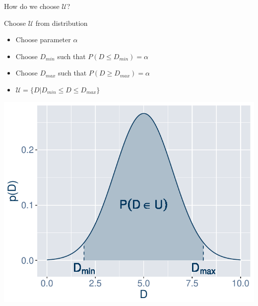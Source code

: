\documentclass[slides]{beamer}
\begin{document}
\begin{frame}{How do we choose $\mathcal{U}$?}
\vspace{-10pt}
\begin{block}{Choose $\mathcal{U}$ from distribution}
    \begin{minipage}[t]{.47\textwidth}


        \begin{itemize}
            \item Choose parameter $\alpha$
            \item Choose $D_{min}$ such that $P(D \leq D_{min}) = \alpha$
            \item Choose $D_{max}$ such that $P(D \geq D_{max}) = \alpha$
            \item $\mathcal{U} = \{D|D_{min} \leq D \leq D_{max}\}$
        \end{itemize}

    \end{minipage}
    \hfill\hfill
    \begin{minipage}[t]{.47\textwidth}
        \begin{center}
            \includegraphics[scale=0.45]{uncertainty-set.pdf} \\
        \end{center}
    \end{minipage}
\end{block}
\end{frame}
\end{document}
